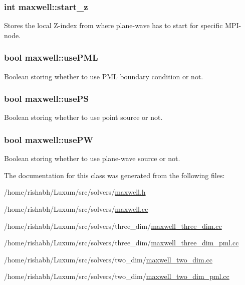 \subsubsection[{\texorpdfstring{start\+\_\+z}{start_z}}]{\setlength{\rightskip}{0pt plus 5cm}int maxwell\+::start\+\_\+z}\hypertarget{classmaxwell_a78f4a1897bee44d03cfc0b661e09dc8e}{}\label{classmaxwell_a78f4a1897bee44d03cfc0b661e09dc8e}
Stores the local Z-\/index from where plane-\/wave has to start for specific M\+P\+I-\/node. 
\subsubsection[{\texorpdfstring{use\+P\+ML}{usePML}}]{\setlength{\rightskip}{0pt plus 5cm}bool maxwell\+::use\+P\+ML}\hypertarget{classmaxwell_aebb8131bb77131dd7f4ce25b0b18ecf9}{}\label{classmaxwell_aebb8131bb77131dd7f4ce25b0b18ecf9}
Boolean storing whether to use P\+ML boundary condition or not. 
\subsubsection[{\texorpdfstring{use\+PS}{usePS}}]{\setlength{\rightskip}{0pt plus 5cm}bool maxwell\+::use\+PS}\hypertarget{classmaxwell_a2c66ad55c831f87be4243ec2acace958}{}\label{classmaxwell_a2c66ad55c831f87be4243ec2acace958}
Boolean storing whether to use point source or not. 
\subsubsection[{\texorpdfstring{use\+PW}{usePW}}]{\setlength{\rightskip}{0pt plus 5cm}bool maxwell\+::use\+PW}\hypertarget{classmaxwell_a356235214e2e5843d2ffe2c8e4214ef8}{}\label{classmaxwell_a356235214e2e5843d2ffe2c8e4214ef8}
Boolean storing whether to use plane-\/wave source or not. 

The documentation for this class was generated from the following files\+:\begin{DoxyCompactItemize}
\item 
/home/rishabh/\+Luxum/src/solvers/\hyperlink{maxwell_8h}{maxwell.\+h}\item 
/home/rishabh/\+Luxum/src/solvers/\hyperlink{maxwell_8cc}{maxwell.\+cc}\item 
/home/rishabh/\+Luxum/src/solvers/three\+\_\+dim/\hyperlink{maxwell__three__dim_8cc}{maxwell\+\_\+three\+\_\+dim.\+cc}\item 
/home/rishabh/\+Luxum/src/solvers/three\+\_\+dim/\hyperlink{maxwell__three__dim__pml_8cc}{maxwell\+\_\+three\+\_\+dim\+\_\+pml.\+cc}\item 
/home/rishabh/\+Luxum/src/solvers/two\+\_\+dim/\hyperlink{maxwell__two__dim_8cc}{maxwell\+\_\+two\+\_\+dim.\+cc}\item 
/home/rishabh/\+Luxum/src/solvers/two\+\_\+dim/\hyperlink{maxwell__two__dim__pml_8cc}{maxwell\+\_\+two\+\_\+dim\+\_\+pml.\+cc}\end{DoxyCompactItemize}
